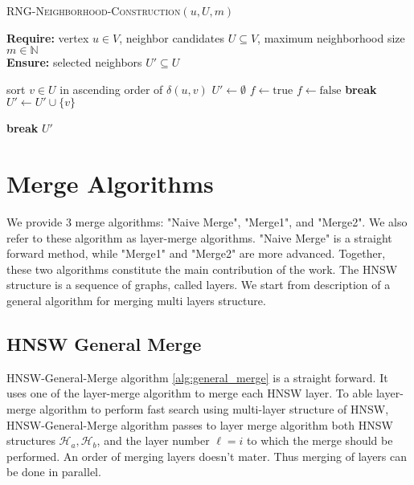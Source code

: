\documentclass{article}
\begin{document}
\begin{algorithm}
\caption{\textsc{RNG-Neighborhood-Construction}$(u, U, m)$}
\label{alg:rngstrategy}
\textbf{Require:} vertex $u \in V$, neighbor candidates $U \subseteq V$, maximum neighborhood size $m \in \mathbb{N}$\\
\textbf{Ensure:} selected neighbors $U' \subseteq U$
\begin{algorithmic}[1]
    \State sort $v \in U$ in ascending order of $\delta(u,v)$
    \State $U' \gets \emptyset$
        \State $f \gets \text{true}$
                \State $f \gets \text{false}$
                \State \textbf{break}
            \EndIf
        \EndFor
            \State $U' \gets U' \cup \{v\}$
        \EndIf

            \State \textbf{break}
        \EndIf
    \EndFor
    \State \Return $U'$
\end{algorithmic}
\end{algorithm}

\section{Merge Algorithms}

We provide 3 merge algorithms: "Naive Merge", "Merge1", and "Merge2". We also refer to these algorithm as layer-merge algorithms. "Naive Merge" is a straight forward method, while "Merge1" and "Merge2" are more advanced. Together, these two algorithms constitute the main contribution of the work. The HNSW structure is a sequence of graphs, called layers. We start from description of a general algorithm for merging multi layers structure.

\subsection{HNSW General Merge}

HNSW-General-Merge algorithm \ref{alg:general_merge} is a straight forward. It uses one of the layer-merge algorithm to merge each HNSW layer. To able layer-merge algorithm to perform fast search using multi-layer structure of HNSW, HNSW-General-Merge algorithm passes to layer merge algorithm both HNSW structures $\mathcal{H}_a, \mathcal{H}_b$, and the layer number $\ell=i$ to which the merge should be performed. An order of merging layers doesn't mater. Thus merging of layers can be done in parallel.
\end{document}
